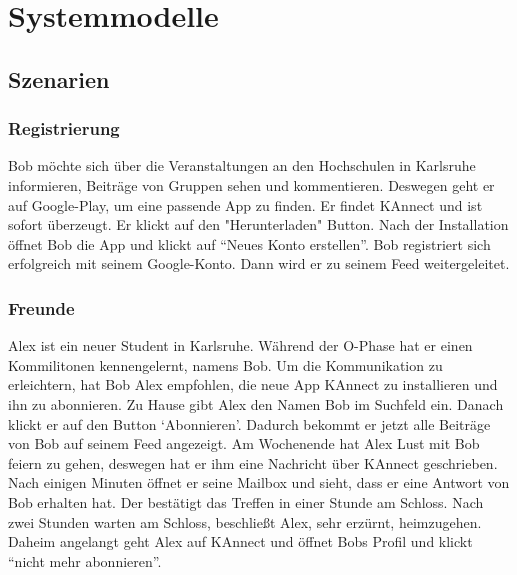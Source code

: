 \documentclass[parskip=full]{scrartcl}
\begin{document}
	\newpage
	\section{Systemmodelle}
	\subsection{Szenarien}
		\subsubsection{Registrierung}
		Bob möchte sich über die Veranstaltungen an den Hochschulen in Karlsruhe informieren, Beiträge von Gruppen sehen und kommentieren. Deswegen geht er auf Google-Play, um eine passende App zu finden. Er findet KAnnect und ist sofort überzeugt. Er klickt auf den "Herunterladen" Button. Nach der Installation öffnet Bob die App und klickt auf “Neues Konto erstellen”. Bob registriert sich erfolgreich mit seinem Google-Konto. Dann wird er zu seinem \gls{Feed} weitergeleitet.
		
		\subsubsection{Freunde}
		Alex ist ein neuer Student in Karlsruhe.  Während der O-Phase hat er einen Kommilitonen kennengelernt, namens Bob. Um die Kommunikation zu erleichtern, hat Bob Alex empfohlen, die neue App  KAnnect zu installieren und ihn zu abonnieren. Zu Hause gibt Alex den Namen Bob im Suchfeld ein. Danach klickt er auf den Button ‘Abonnieren’. Dadurch bekommt er jetzt alle Beiträge von Bob auf seinem \gls{Feed} angezeigt. Am Wochenende hat Alex Lust mit Bob feiern zu gehen, deswegen hat er ihm eine Nachricht über KAnnect geschrieben. Nach einigen Minuten öffnet er seine Mailbox und sieht, dass er eine Antwort von Bob erhalten hat. Der bestätigt das Treffen in einer Stunde am Schloss. Nach zwei Stunden warten am Schloss, beschließt Alex, sehr erzürnt, heimzugehen. Daheim angelangt geht Alex auf KAnnect und öffnet Bobs Profil und klickt “nicht mehr abonnieren”.
		
\end{document}
